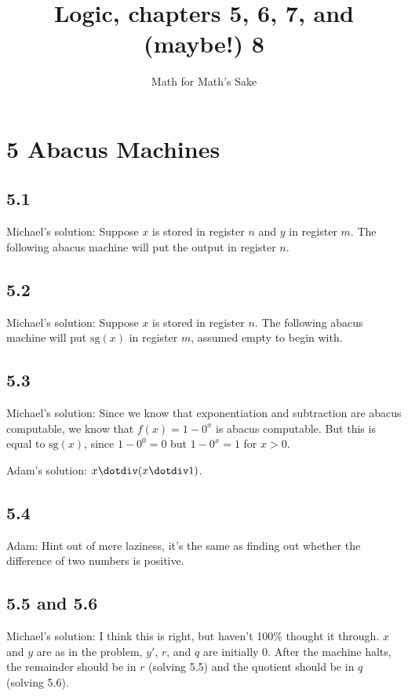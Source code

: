 \documentclass{article}
\title{Logic, chapters 5, 6, 7, and (maybe!) 8}
\author{Math for Math's Sake}
\newcommand\s{\section*}
\renewcommand\ss{\subsection*}
\newcommand\ms{Michael's solution: } %
\begin{document}
\maketitle
\s{5 Abacus Machines}
\ss{5.1}
\ms Suppose $x$ is stored in register $n$ and $y$ in register $m$.  The following abacus machine will put the output in register $n$.

\begin{center}
\end{center}

\ss{5.2}
\ms Suppose $x$ is stored in register $n$.  The following abacus
machine will put $\mathrm{sg}(x)$ in register $m$, assumed empty to begin with.

\begin{center}
\end{center}
\ss{5.3}
\ms Since we know that exponentiation and subtraction are abacus computable, we know that $f(x)=1-0^x$ is abacus computable.  But this is equal to
$\mathrm{sg}(x)$, since $1-0^0 = 0$ but $1-0^x = 1$ for $x>0$.

Adam's solution: $x\dotdiv (x\dotdiv 1)$.
\ss{5.4} Adam: Hint out of mere laziness, it's the same as finding out whether the difference of two numbers is positive.  
\ss{5.5 and 5.6}
\ms I think this is right, but haven't 100\% thought it through. $x$ and $y$ are as in the problem, $y'$, $r$, and $q$ are initially 0.  After the machine halts, the remainder should be in $r$ (solving 5.5) and the quotient should be in $q$ (solving 5.6).
\end{document}
